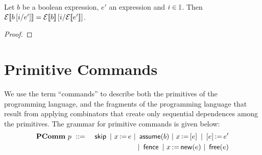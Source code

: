 \documentclass[11pt]{report}
\begin{document}
\begin{lemma}
  \label{lem:bexp-sem-subst}
  Let $b$ be a boolean expression, $e'$ an expression and $i \in \mathbb{I}$. Then $\mathcal{E}[\![b\left[i / e'\right]]\!] = \mathcal{E}[\![b]\!]\left[i / \mathcal{E}[\![e']\!]\right]$.
\end{lemma}

\begin{proof}
  

\end{proof}




\section{Primitive Commands} %
\label{sec:primitive_commands}

We use the term ``commands'' to describe both the primitives of the programming language, and the fragments of the programming language that result from applying combinators that create only sequential dependences among the primitives. The grammar for primitive commands is given below: 
\begin{eqnarray*}
	\mathbf{PComm}~p & ~::=~ & \operatorname{\mathsf{skip}} ~|~ x \operatorname{:\!=} e ~|~ \operatorname{\mathsf{assume}}(b) ~|~  x \operatorname{:\!=} \left[ e \right] ~|~ \left[ e \right] \operatorname{:\!=} e' \\
	& & ~|~ \operatorname{\mathsf{fence}} ~|~ x \operatorname{:\!=} \operatorname{\mathsf{new}}(e) ~|~ \operatorname{\mathsf{free}}(e)
\end{eqnarray*}
\end{document}
